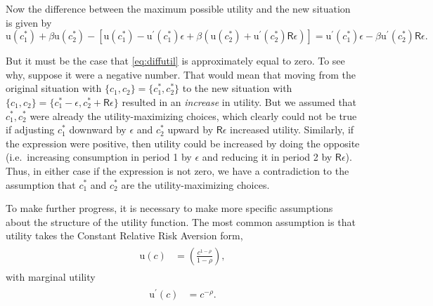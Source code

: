 \documentclass{scrartcl}
\begin{document}
  Now the difference between the maximum possible utility and the new situation is given by
  \begin{equation} \mathrm{u}(\boldsymbol{\mathit{c}}_{1}^{*})+\beta \mathrm{u}(\boldsymbol{\mathit{c}}_{2}^{*}) - \left[\mathrm{u}(\boldsymbol{\mathit{c}}_{1}^{*})-\mathrm{u}^{\prime}(\boldsymbol{\mathit{c}}_{1}^{*})\epsilon + \beta \left(\mathrm{u}(\boldsymbol{\mathit{c}}_{2}^{*})+\mathrm{u}^{\prime}(\boldsymbol{\mathit{c}}_{2}^{*})\mathsf{R}\epsilon \right) \right] = \mathrm{u}^{\prime}(\boldsymbol{\mathit{c}}_{1}^{*})\epsilon - \beta \mathrm{u}^{\prime}(\boldsymbol{\mathit{c}}_{2}^{*})\mathsf{R}\epsilon \label{eq:diffutil}.
  \end{equation}

  But it must be the case that \eqref{eq:diffutil} is approximately equal to zero.
  To see why, suppose it were a negative number.
  That would mean that moving from the original situation with $\{\boldsymbol{\mathit{c}}_{1},\boldsymbol{\mathit{c}}_{2}\} = \{\boldsymbol{\mathit{c}}_{1}^{*},\boldsymbol{\mathit{c}}_{2}^{*}\}$ to the new situation with $\{\boldsymbol{\mathit{c}}_{1},\boldsymbol{\mathit{c}}_{2}\} = \{\boldsymbol{\mathit{c}}_{1}^{*}-\epsilon,\boldsymbol{\mathit{c}}_{2}^{*}+\mathsf{R}\epsilon\}$ resulted in an \textit{ increase} in utility.
  But we assumed that $\boldsymbol{\mathit{c}}_{1}^{*},\boldsymbol{\mathit{c}}_{2}^{*}$ were already the utility-maximizing choices, which clearly could not be true if adjusting $\boldsymbol{\mathit{c}}_{1}^{*}$ downward by $\epsilon$ and $\boldsymbol{\mathit{c}}^{*}_{2}$ upward by $\mathsf{R} \epsilon$ increased utility.
  Similarly, if the expression were positive, then utility could be increased by doing the opposite (i.e.\ increasing consumption in period 1 by $\epsilon$ and reducing it in period 2 by $\mathsf{R}\epsilon$).
  Thus, in either case if the expression is not zero, we have a contradiction to the assumption that $\boldsymbol{\mathit{c}}_{1}^{*}$ and $\boldsymbol{\mathit{c}}_{2}^{*}$ are the utility-maximizing choices.

  To make further progress, it is necessary to make more specific assumptions about the structure of the utility function.
  The most common assumption is that utility takes the Constant Relative Risk Aversion form,
  \begin{equation}\begin{gathered}\begin{aligned} \mathrm{u}(\boldsymbol{\mathit{c}}) & = \left(\frac{\boldsymbol{\mathit{c}}^{1-\rho}}{1-\rho}\right) \label{eq:crrautil},
      \end{aligned}\end{gathered}\end{equation} with marginal utility
  \begin{equation}\begin{gathered}\begin{aligned} \mathrm{u}^{\prime}(\boldsymbol{\mathit{c}}) & = \boldsymbol{\mathit{c}}^{-\rho} \label{eq:crramargutil}.
      \end{aligned}\end{gathered}\end{equation}
\end{document}

